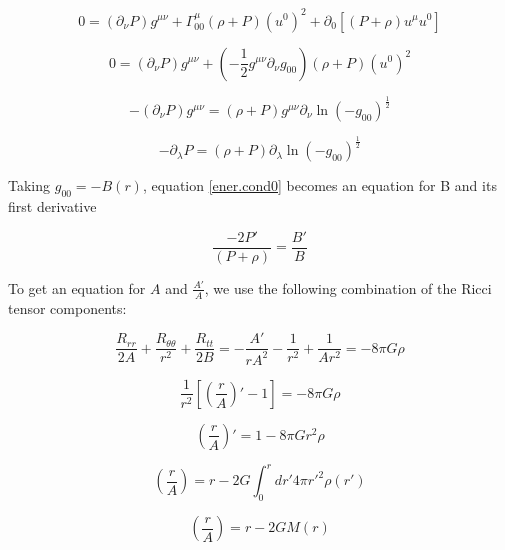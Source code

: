 \begin{equation}
0 = (\partial_\nu P) g^{\mu \nu} + \Gamma^\mu_{00} (\rho+ P) (u^0)^2 + \partial_0 \left[ (P+\rho) u^\mu u^0 \right]
\end{equation}

\begin{equation}
0 = (\partial_\nu P) g^{\mu \nu} + \left(-\frac{1}{2}g^{\mu \nu} \partial_\nu g_{00} \right) (\rho+ P) (u^0)^2 
\end{equation}

\begin{equation}
-(\partial_\nu P) g^{\mu \nu} = (\rho+ P) g^{\mu \nu} \partial_\nu \ln{(-g_{00})^{\frac{1}{2}}}
\end{equation}

\begin{equation}\label{ener.cond0}
-\partial_\lambda P  = (\rho+ P)  \partial_\lambda \ln{(-g_{00})^{\frac{1}{2}}}
\end{equation}

Taking $g_{00} = -B(r)$, equation \ref{ener.cond0} becomes an equation for B and its first derivative

\begin{equation}\label{B'/B}
\frac{-2P'}{(P+\rho)} = \frac{B'}{B}
\end{equation}


To get an equation for $A$ and $\frac{A'}{A}$, we use the following combination of the Ricci tensor components:

\begin{equation}
\frac{R_{rr}}{2A} +\frac{R_{\theta \theta}}{r^2} + \frac{R_{tt}}{2B} = -\frac{A'}{rA^2} - \frac{1}{r^2} + \frac{1}{A r^2} = -8\pi G \rho
\end{equation}

\begin{equation}
\frac{1}{r^2} \left[ \left(\frac{r}{A} \right)' - 1 \right] = -8\pi G \rho
\end{equation}

\begin{equation}
 \left(\frac{r}{A}\right)' = 1 - 8\pi G r^2 \rho
\end{equation}

\begin{equation}
\left(\frac{r}{A}\right) = r - 2G \int_0^r dr'4\pi  r'^2 \rho(r')
\end{equation}

\begin{equation}
\left(\frac{r}{A}\right) = r - 2G M(r)
\end{equation}

